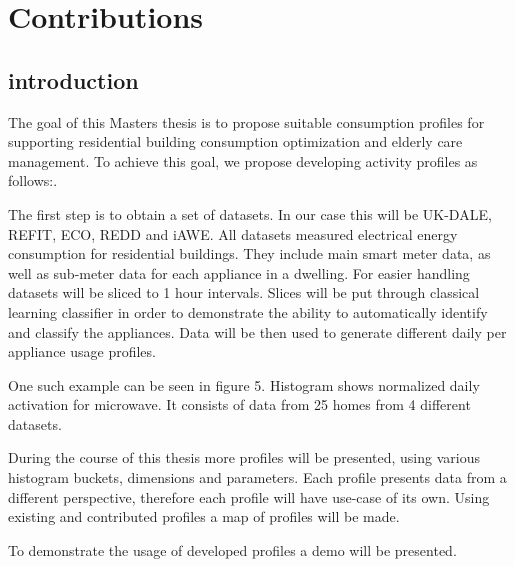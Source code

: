 
\chapter{Contributions} %

\label{Chapter5} %


\section*{introduction}

The goal of this Masters thesis is to propose suitable consumption profiles for supporting residential building consumption optimization and elderly care management.
To achieve this goal, we propose developing activity profiles as follows:. 

The first step is to obtain a set of datasets. In our case this will be UK-DALE, REFIT, ECO, REDD and iAWE.
All datasets measured electrical energy consumption for residential buildings. 
They include main smart meter data, as well as sub-meter data for each appliance in a dwelling. 
For easier handling datasets will be sliced to 1 hour intervals. 
Slices will be put through classical learning classifier in order to demonstrate the ability to automatically identify and classify the appliances.
Data will be then used to generate different daily per appliance usage profiles.


One such example can be seen in figure 5. Histogram shows normalized daily 
activation for microwave. It consists of data from 25 homes from 4 different
datasets. 

During the course of this thesis more profiles will be presented, using various histogram buckets, dimensions and parameters. 
Each profile presents data from a different perspective, therefore each profile will have use-case of its own.
Using existing and contributed profiles a map of profiles will be made. 

To demonstrate the usage of developed profiles a demo will be presented. 